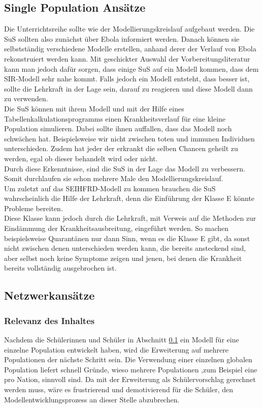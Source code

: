 \subsection{Single Population Ansätze}\label{ssec:did:spa}
\ellen
Die Unterrichtsreihe sollte wie der Modellierungskreislauf aufgebaut werden. Die SuS sollten also zunächst über Ebola informiert werden. Danach können sie selbstständig verschiedene Modelle erstellen, anhand derer der Verlauf von Ebola rekonstruiert werden kann. Mit geschickter Auswahl der Vorbereitungsliteratur kann man jedoch dafür sorgen, dass einige SuS auf ein Modell kommen, dass dem SIR-Modell sehr nahe kommt. Falls jedoch ein Modell entsteht, dass besser ist, sollte die Lehrkraft in der Lage sein, darauf zu reagieren und diese Modell dann zu verwenden.\\
Die SuS können mit ihrem Modell und mit der Hilfe eines Tabellenkalkulationsprogramms einen Krankheitsverlauf für eine kleine Population simulieren. Dabei sollte ihnen auffallen, dass das Modell noch schwächen hat. Beispielsweise wir nicht zwischen toten und immunen Individuen unterschieden. Zudem hat jeder der erkrankt die selben Chancen geheilt zu werden, egal ob dieser behandelt wird oder nicht.\\
 Durch diese Erkenntnisse, sind die SuS in der Lage das Modell zu verbessern. Somit durchlaufen sie schon mehrere Male den Modellierungskreislauf.\\
 Um zuletzt auf das SEIHFRD-Modell zu kommen brauchen die SuS wahrscheinlich die Hilfe der Lehrkraft, denn die Einführung der Klasse \glqq E\grqq{} könnte Probleme bereiten.\\
 Diese Klasse kann jedoch durch die Lehrkraft, mit Verweis auf die Methoden zur Eindämmung der Krankheitsausbreitung, eingeführt werden. So machen beispielsweise Quarantänen nur dann Sinn, wenn es die Klasse \glqq E\grqq{} gibt, da sonst nicht zwischen denen unterschieden werden kann, die bereits ansteckend sind, aber selbst noch keine Symptome zeigen und jenen, bei denen die Krankheit bereits vollständig ausgebrochen ist.  
\subsection{Netzwerkansätze}\steffen
\subsubsection*{Relevanz des Inhaltes}
Nachdem die Schülerinnen und Schüler in Abschnitt \ref{ssec:did:spa} ein Modell für eine einzelne Population entwickelt haben, wird die Erweiterung auf mehrere Populationen der nächste Schritt sein. Die Verwendung einer einzelnen globalen Population liefert schnell Gründe, wieso mehrere Populationen ,zum Beispiel eine pro Nation, sinnvoll sind. Da mit der Erweiterung als Schülervorschlag gerechnet werden muss, wäre es frustrierend und demotivierend für die Schüler, den Modellentwicklungsprozess an dieser Stelle abzubrechen.
